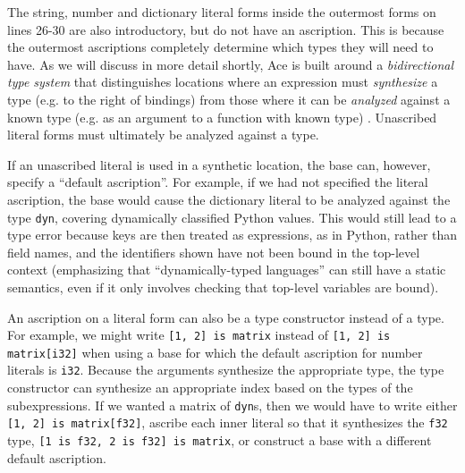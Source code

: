 {%
The string, number and dictionary literal forms inside the outermost forms on lines 26-30 are also  introductory, but do not have an ascription. This is because the outermost ascriptions completely determine which types they will need to have. As we will discuss in more detail shortly, Ace is built around a \emph{bidirectional type system} that distinguishes locations where an expression must \emph{synthesize} a type (e.g. to the right of bindings) from those where it can be \emph{analyzed} against a known type (e.g. as an argument to a function with known type) \cite{Lovas08abidirectional}. Unascribed literal forms must ultimately be analyzed against a type. 

If an unascribed literal is used in a synthetic location, the base can, however, specify a ``default ascription''. For example, if we had not specified the literal ascription, the base would cause the dictionary literal to be analyzed against the type \verb|dyn|, covering dynamically classified Python values. This would still lead to a type error because keys are then treated as expressions, as in Python, rather than field names, and the identifiers shown have not been bound in the top-level context (emphasizing that ``dynamically-typed languages'' can still have a static semantics, even if it only involves checking that top-level variables are bound).%

An ascription on a literal form can also be a {type constructor} instead of a type. For example, we might write \verb|[1, 2] is matrix| instead of \verb|[1, 2] is matrix[i32]| when using a base for which the default ascription for number literals is \verb|i32|. Because the arguments synthesize the appropriate type, the type constructor can synthesize an appropriate index based on the types of the subexpressions. If we wanted a matrix of \verb|dyn|s, then we would have to write either \verb|[1, 2] is matrix[f32]|, ascribe each inner literal so that it synthesizes the \verb|f32| type, \verb|[1 is f32, 2 is f32] is matrix|, or construct a base with a different default ascription. 


}
